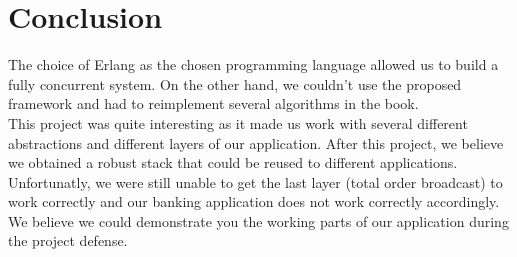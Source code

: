 \documentclass[11pt,english,a4paper]{article}
\begin{document}
\section{Conclusion}
The choice of Erlang as the chosen programming language allowed us to build a fully concurrent system.
On the other hand, we couldn't use the proposed framework and had to reimplement several algorithms in the book.\\

This project was quite interesting as it made us work with several different abstractions and different layers of our application.
After this project, we believe we obtained a robust stack that could be reused to different applications.\\

Unfortunatly, we were still unable to get the last layer (total order broadcast) to work correctly and our banking application does not work correctly accordingly.
We believe we could demonstrate you the working parts of our application during the project defense.
\end{document}
